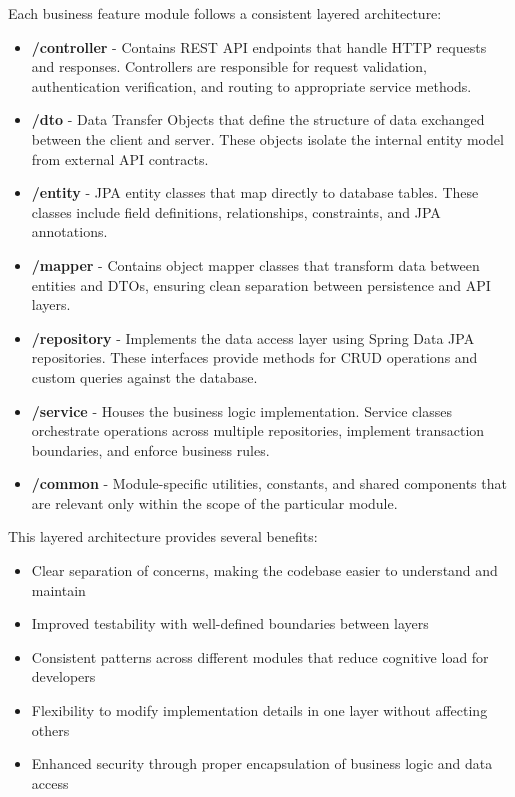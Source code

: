 Each business feature module follows a consistent layered architecture:

\begin{itemize}
    \item \textbf{/controller} - Contains REST API endpoints that handle HTTP requests and responses. Controllers are responsible for request validation, authentication verification, and routing to appropriate service methods.
    
    \item \textbf{/dto} - Data Transfer Objects that define the structure of data exchanged between the client and server. These objects isolate the internal entity model from external API contracts.
    
    \item \textbf{/entity} - JPA entity classes that map directly to database tables. These classes include field definitions, relationships, constraints, and JPA annotations.
    
    \item \textbf{/mapper} - Contains object mapper classes that transform data between entities and DTOs, ensuring clean separation between persistence and API layers.
    
    \item \textbf{/repository} - Implements the data access layer using Spring Data JPA repositories. These interfaces provide methods for CRUD operations and custom queries against the database.
    
    \item \textbf{/service} - Houses the business logic implementation. Service classes orchestrate operations across multiple repositories, implement transaction boundaries, and enforce business rules.
    
    \item \textbf{/common} - Module-specific utilities, constants, and shared components that are relevant only within the scope of the particular module.
\end{itemize}

This layered architecture provides several benefits:

\begin{itemize}
    \item Clear separation of concerns, making the codebase easier to understand and maintain
    \item Improved testability with well-defined boundaries between layers
    \item Consistent patterns across different modules that reduce cognitive load for developers
    \item Flexibility to modify implementation details in one layer without affecting others
    \item Enhanced security through proper encapsulation of business logic and data access
\end{itemize}

